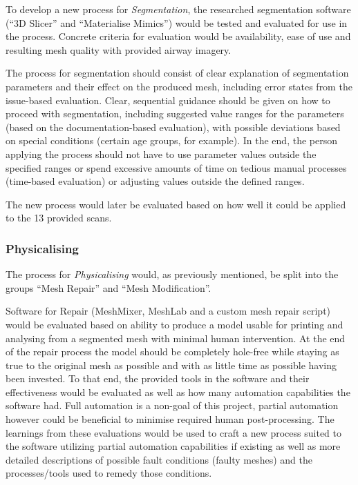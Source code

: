 \documentclass[MME,Projekt,english]{twbook}%
\begin{document}
To develop a new process for \emph{Segmentation}, the researched segmentation software (“3D Slicer” and “Materialise Mimics”) would be tested and evaluated for use in the process. Concrete criteria for evaluation would be availability, ease of use and resulting mesh quality with provided airway imagery.

The process for segmentation should consist of clear explanation of segmentation parameters and their effect on the produced mesh, including error states from the issue-based evaluation. Clear, sequential guidance should be given on how to proceed with segmentation, including suggested value ranges for the parameters (based on the documentation-based evaluation), with possible deviations based on special conditions (certain age groups, for example). In the end, the person applying the process should not have to use parameter values outside the specified ranges or spend excessive amounts of time on tedious manual processes (time-based evaluation) or adjusting values outside the defined ranges.

The new process would later be evaluated based on how well it could be applied to the 13 provided scans.

\subsubsection{Physicalising}

The process for \emph{Physicalising} would, as previously mentioned, be split into the groups “Mesh Repair” and “Mesh Modification”.

Software for Repair (MeshMixer, MeshLab and a custom mesh repair script) would be evaluated based on ability to produce a model usable for printing and analysing from a segmented mesh with minimal human intervention. At the end of the repair process the model should be completely hole-free while staying as true to the original mesh as possible and with as little time as possible having been invested. To that end, the provided tools in the software and their effectiveness would be evaluated as well as how many automation capabilities the software had. Full automation is a non-goal of this project, partial automation however could be beneficial to minimise required human post-processing. The learnings from these evaluations would be used to craft a new process suited to the software utilizing partial automation capabilities if existing as well as more detailed descriptions of possible fault conditions (faulty meshes) and the processes/tools used to remedy those conditions.
\end{document}
